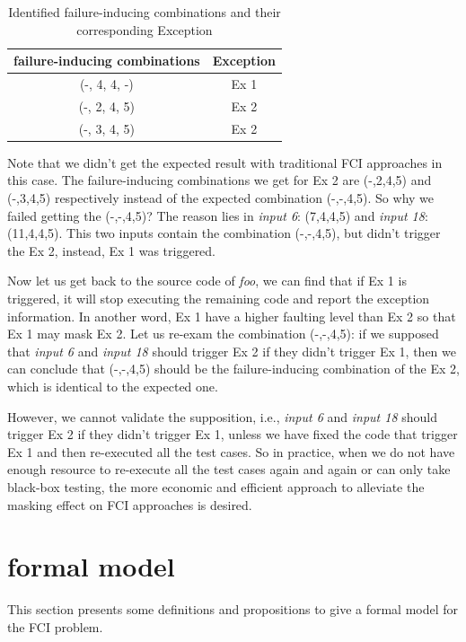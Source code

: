 \documentclass{sig-alternate}
\begin{document}
\begin{table}
\centering
\caption{Identified failure-inducing combinations and their corresponding Exception}
\label{identify-example}
\begin{tabular}{|c|c|} \hline
failure-inducing combinations & Exception\\ \hline
(-, 4, 4, -) &  Ex 1\\ \hline
(-, 2, 4, 5) &  Ex 2\\ \hline
(-, 3, 4, 5) &  Ex 2\\ \hline
\hline\end{tabular}
\end{table}

Note that we didn't get the expected result with traditional FCI approaches in this case. The failure-inducing combinations we get for Ex 2 are (-,2,4,5) and (-,3,4,5) respectively instead of the expected combination (-,-,4,5). So why we failed getting the (-,-,4,5)? The reason lies in \emph{input 6}: (7,4,4,5) and \emph{input 18}: (11,4,4,5). This two inputs contain the combination (-,-,4,5), but didn't trigger the Ex 2, instead,  Ex 1 was triggered.


Now let us get back to the source code of \emph{foo}, we can find that if Ex 1 is triggered, it will stop executing the remaining code and report the exception information. In another word, Ex 1 have a higher faulting level than Ex 2 so that Ex 1 may mask Ex 2. Let us re-exam the combination (-,-,4,5): if we supposed that \emph{input 6} and \emph{input 18} should trigger Ex 2 if they didn't trigger Ex 1, then we can conclude that (-,-,4,5) should be the failure-inducing combination of the Ex 2, which is identical to the expected one.

However, we cannot validate the supposition, i.e., \emph{input 6} and \emph{input 18} should trigger Ex 2 if they didn't trigger Ex 1, unless we have fixed the code that trigger Ex 1 and then re-executed all the test cases. So in practice, when we do not have enough resource to re-execute all the test cases again and again or can only take black-box testing, the more economic and efficient approach to alleviate the masking effect on FCI approaches is desired.

\section{formal model}
This section presents some definitions and propositions to give a formal model for the FCI problem.
\end{document}
